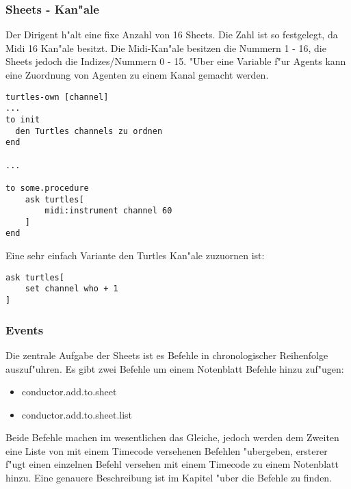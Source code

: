 \subsubsection{Sheets - Kan"ale}\label{sec:sheet-channel}
Der Dirigent h"alt eine fixe Anzahl von 16 Sheets. Die Zahl ist so festgelegt,
da Midi 16 Kan"ale besitzt. Die Midi-Kan"ale besitzen die Nummern 1 - 16, die
Sheets jedoch die Indizes/Nummern 0 - 15. "Uber eine Variable f"ur Agents kann
eine Zuordnung von Agenten zu einem Kanal gemacht werden. 
\begin{lstlisting}[language=Logo]
turtles-own [channel]
...
to init
  den Turtles channels zu ordnen
end

...

to some.procedure
	ask turtles[
		midi:instrument channel 60
	]
end
\end{lstlisting}
Eine sehr einfach Variante den Turtles Kan"ale zuzuornen ist:
\begin{lstlisting}[language=Logo]
ask turtles[
	set channel who + 1
]
\end{lstlisting}

\subsubsection{Events}
Die zentrale Aufgabe der Sheets ist es Befehle in chronologischer Reihenfolge
auszuf"uhren. Es gibt zwei Befehle um einem Notenblatt Befehle hinzu zuf"ugen:
\begin{itemize}
\item conductor.add.to.sheet
\item conductor.add.to.sheet.list
\end{itemize}
Beide Befehle machen im wesentlichen das Gleiche, jedoch werden dem Zweiten
eine Liste von mit einem Timecode versehenen Befehlen "ubergeben, ersterer f"ugt
einen einzelnen Befehl versehen mit einem Timecode zu einem Notenblatt hinzu. 
Eine genauere Beschreibung ist im Kapitel "uber die Befehle zu finden. 



